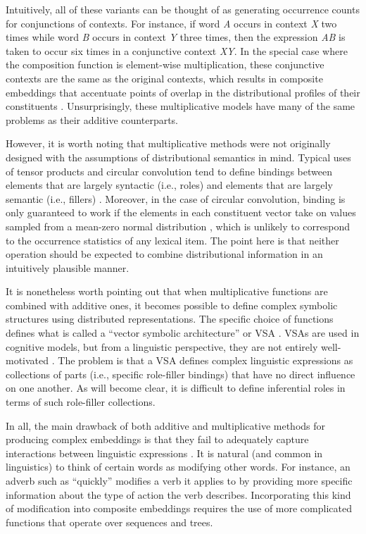 Intuitively, all of these variants can be thought of as generating occurrence counts for conjunctions of contexts. For instance, if word \textit{A} occurs in context \textit{X} two times while word \textit{B} occurs in context \textit{Y} three times, then the expression \textit{AB} is taken to occur six times in a conjunctive context \textit{XY}. In the special case where the composition function is element-wise multiplication, these conjunctive contexts are the same as the original contexts, which results in composite embeddings that accentuate points of overlap in the distributional profiles of their constituents \citep{Baroni:2014,Mitchell:2010}. Unsurprisingly, these multiplicative models have many of the same problems as their additive counterparts.

However, it is worth noting that multiplicative methods were not originally designed with the assumptions of distributional semantics in mind. Typical uses of tensor products and circular convolution tend to define bindings between elements that are largely syntactic (i.e., roles) and elements that are largely semantic (i.e., fillers) \citep{SmolenskyLegendre:2006,Plate:2003}. Moreover, in the case of circular convolution, binding is only guaranteed to work if the elements in each constituent vector take on values sampled from a mean-zero normal distribution \citep{Plate:2003}, which is unlikely to correspond to the occurrence statistics of any lexical item. The point here is that neither operation should be expected to combine distributional information in an intuitively plausible manner.

It is nonetheless worth pointing out that when multiplicative functions are combined with additive ones, it becomes possible to define complex symbolic structures using distributed representations. The specific choice of functions defines what is called a ``vector symbolic architecture'' or VSA \citep{Gayler:2004}. VSAs are used in cognitive models, but from a linguistic perspective, they are not entirely well-motivated \citep{Eliasmith:2013}. The problem is that a VSA defines complex linguistic expressions as collections of parts (i.e., specific role-filler bindings) that have no direct influence on one another. As will become clear, it is difficult to define inferential roles in terms of such role-filler collections. 

In all, the main drawback of both additive and multiplicative methods for producing complex embeddings is that they fail to adequately capture interactions between linguistic expressions \citep{Baroni:2014}. It is natural (and common in linguistics) to think of certain words as modifying other words. For instance, an adverb such as ``quickly'' modifies a verb it applies to by providing more specific information about the type of action the verb describes. Incorporating this kind of modification into composite embeddings requires the use of more complicated functions that operate over sequences and trees. 

